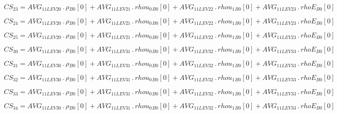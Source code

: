 \documentclass{article}
\begin{document}
\begin{dmath}CS_{23} = AVG_{1 1 LEV 20} \,.\, {\rho{_{B0}}}[{0}] + AVG_{1 1 LEV 21} \,.\, {rhou_{0}{_{B0}}}[{0}] + AVG_{1 1 LEV 22} \,.\, {rhou_{1}{_{B0}}}[{0}] + AVG_{1 1 LEV 23} \,.\, {rhoE{_{B0}}}[{0}]\end{dmath}

\begin{dmath}CS_{24} = AVG_{1 1 LEV 20} \,.\, {\rho{_{B0}}}[{0}] + AVG_{1 1 LEV 21} \,.\, {rhou_{0}{_{B0}}}[{0}] + AVG_{1 1 LEV 22} \,.\, {rhou_{1}{_{B0}}}[{0}] + AVG_{1 1 LEV 23} \,.\, {rhoE{_{B0}}}[{0}]\end{dmath}

\begin{dmath}CS_{25} = AVG_{1 1 LEV 20} \,.\, {\rho{_{B0}}}[{0}] + AVG_{1 1 LEV 21} \,.\, {rhou_{0}{_{B0}}}[{0}] + AVG_{1 1 LEV 22} \,.\, {rhou_{1}{_{B0}}}[{0}] + AVG_{1 1 LEV 23} \,.\, {rhoE{_{B0}}}[{0}]\end{dmath}

\begin{dmath}CS_{30} = AVG_{1 1 LEV 30} \,.\, {\rho{_{B0}}}[{0}] + AVG_{1 1 LEV 31} \,.\, {rhou_{0}{_{B0}}}[{0}] + AVG_{1 1 LEV 32} \,.\, {rhou_{1}{_{B0}}}[{0}] + AVG_{1 1 LEV 33} \,.\, {rhoE{_{B0}}}[{0}]\end{dmath}

\begin{dmath}CS_{31} = AVG_{1 1 LEV 30} \,.\, {\rho{_{B0}}}[{0}] + AVG_{1 1 LEV 31} \,.\, {rhou_{0}{_{B0}}}[{0}] + AVG_{1 1 LEV 32} \,.\, {rhou_{1}{_{B0}}}[{0}] + AVG_{1 1 LEV 33} \,.\, {rhoE{_{B0}}}[{0}]\end{dmath}

\begin{dmath}CS_{32} = AVG_{1 1 LEV 30} \,.\, {\rho{_{B0}}}[{0}] + AVG_{1 1 LEV 31} \,.\, {rhou_{0}{_{B0}}}[{0}] + AVG_{1 1 LEV 32} \,.\, {rhou_{1}{_{B0}}}[{0}] + AVG_{1 1 LEV 33} \,.\, {rhoE{_{B0}}}[{0}]\end{dmath}

\begin{dmath}CS_{33} = AVG_{1 1 LEV 30} \,.\, {\rho{_{B0}}}[{0}] + AVG_{1 1 LEV 31} \,.\, {rhou_{0}{_{B0}}}[{0}] + AVG_{1 1 LEV 32} \,.\, {rhou_{1}{_{B0}}}[{0}] + AVG_{1 1 LEV 33} \,.\, {rhoE{_{B0}}}[{0}]\end{dmath}

\begin{dmath}CS_{34} = AVG_{1 1 LEV 30} \,.\, {\rho{_{B0}}}[{0}] + AVG_{1 1 LEV 31} \,.\, {rhou_{0}{_{B0}}}[{0}] + AVG_{1 1 LEV 32} \,.\, {rhou_{1}{_{B0}}}[{0}] + AVG_{1 1 LEV 33} \,.\, {rhoE{_{B0}}}[{0}]\end{dmath}
\end{document}
